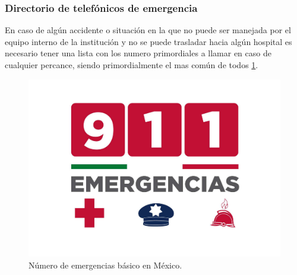 \subsubsection{Directorio de telefónicos de emergencia}
En caso de algún accidente o situación en la que no puede ser manejada por el equipo interno de la institución y no se puede trasladar hacia algún hospital es necesario tener una lista con los numero primordiales a llamar en caso de cualquier percance, siendo primordialmente el mas común de todos \ref{fig:numero911}.
\begin{figure}[H]
    \centering
    \includegraphics[trim = {20mm 30mm 20mm 30mm},clip,scale=0.35]{19/Img/numero911.pdf}
    \caption{Número de emergencias básico en México.}
    \label{fig:numero911}
\end{figure}

